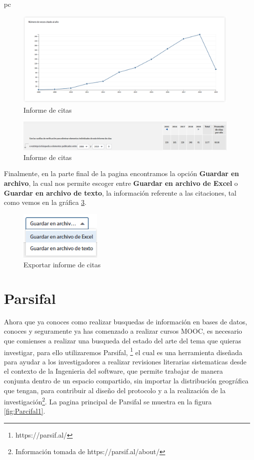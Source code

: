 pc\documentclass[a4paper,12pt,openany]{book}
\begin{document}
\begin{itemize}
    \begin{figure}[H]
    \centering
	\includegraphics[width=11cm]{Wos17.png}
    \caption{Informe de citas}
    \label{fig:WOS17}
    \end{figure}

    \begin{figure}[H]
    \centering
	\includegraphics[width=11cm]{Wos18.png}
    \caption{Informe de citas}
    \label{fig:WOS18}
    \end{figure}

Finalmente, en la parte final de la pagina encontramos la opción \textbf{Guardar en archivo}, la cual nos permite escoger entre \textbf{Guardar en archivo de Excel} o \textbf{Guardar en archivo de texto}, la información referente a las citaciones, tal como vemos en la gráfica \ref{fig:WOS19}.

    \begin{figure}[H]
    \centering
	\includegraphics[width=4cm]{Wos19.png}
    \caption{Exportar informe de citas}
    \label{fig:WOS19}
    \end{figure}


\chapter{Parsifal}
Ahora que ya conoces como realizar busquedas de información en bases de datos, conoces y seguramente ya has comenzado a realizar cursos MOOC, es necesario que comienses a realizar una busqueda del estado del arte del tema que quieras investigar, para ello utilizaremos Parsifal, \footnote{https://parsif.al/} el cual es una herramienta diseñada para ayudar a los investigadores a realizar revisiones literarias sistematicas desde el contexto de la Ingenieria del software, que permite trabajar de manera conjunta dentro de un espacio compartido, sin importar la distribución geográfica que tengan, para contribuir al diseño del protocolo y a la realización de la investigación\footnote{Información tomada de https://parsif.al/about/}. La pagina principal de Parsifal se muestra en la figura \ref{fig:Parcifal1}.


\end{itemize}
\end{document}
